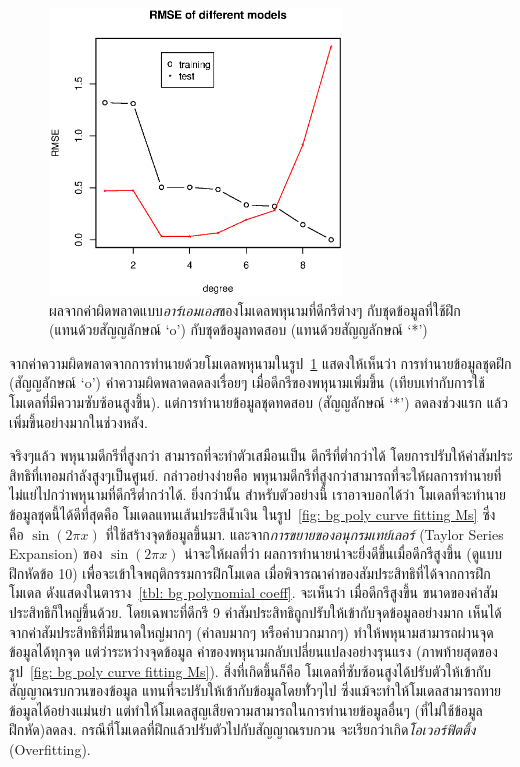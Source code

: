 %
\begin{figure}
\begin{center}
\includegraphics[height=3.0in]{02Background/bgModelEval.eps}
\end{center}
\caption{ผลจากค่าผิดพลาดแบบ\textit{อาร์เอมเอส}ของโมเดลพหุนามที่ดีกรีต่างๆ
กับชุดข้อมูลที่ใช้ฝึก (แทนด้วยสัญญลักษณ์ `o')
กับชุดข้อมูลทดสอบ (แทนด้วยสัญญลักษณ์ `*')}
\label{fig: bg train and test RMSEs}
\end{figure}
%

จากค่าความผิดพลาดจากการทำนายด้วยโมเดลพหุนามในรูป~\ref{fig: bg train and test RMSEs} แสดงให้เห็นว่า การทำนายข้อมูลชุดฝึก (สัญญลักษณ์ `o') ค่าความผิดพลาดลดลงเรื่อยๆ เมื่อดีกรีของพหุนามเพิ่มขึ้น (เทียบเท่ากับการใช้โมเดลที่มีความซับซ้อนสูงขึ้น).
แต่การทำนายข้อมูลชุดทดสอบ (สัญญลักษณ์ `*') ลดลงช่วงแรก แล้วเพิ่มขึ้นอย่างมากในช่วงหลัง.

จริงๆแล้ว พหุนามดีกรีที่สูงกว่า สามารถที่จะทำตัวเสมือนเป็น ดีกรีที่ต่ำกว่าได้ โดยการปรับให้ค่าสัมประสิทธิที่เทอมกำลังสูงๆเป็นศูนย์.
กล่าวอย่างง่ายคือ พหุนามดีกรีที่สูงกว่าสามารถที่จะให้ผลการทำนายที่ไม่แย่ไปกว่าพหุนามที่ดีกรีต่ำกว่าได้.
ยิ่งกว่านั้น สำหรับตัวอย่างนี้ เราอาจบอกได้ว่า โมเดลที่จะทำนายข้อมูลชุดนี้ได้ดีที่สุดคือ โมเดลแทนเส้นประสีน้ำเงิน ในรูป~\ref{fig: bg poly curve fitting Ms} ซึ่ง คือ $\sin(2 \pi x)$  ที่ใช้สร้างจุดข้อมูลขึ้นมา.
และจาก\textit{การขยายของอนุกรมเทย์เลอร์} (Taylor Series Expansion) ของ $\sin(2 \pi x)$ น่าจะให้ผลที่ว่า ผลการทำนายน่าจะยิ่งดีขึ้นเมื่อดีกรีสูงขึ้น (ดูแบบฝึกหัดข้อ 10)
%
เพื่อจะเข้าใจพฤติกรรมการฝึกโมเดล เมื่อพิจารณาค่าของสัมประสิทธิที่ได้จากการฝึกโมเดล ดังแสดงในตาราง~\ref{tbl: bg polynomial coeff}.
จะเห็นว่า เมื่อดีกรีสูงขึ้น ขนาดของค่าสัมประสิทธิก็ใหญ่ขึ้นด้วย.
โดยเฉพาะที่ดีกรี 9 ค่าสัมประสิทธิถูกปรับให้เข้ากับจุดข้อมูลอย่างมาก เห็นได้จากค่าสัมประสิทธิที่มีขนาดใหญ่มากๆ (ค่าลบมากๆ หรือค่าบวกมากๆ) 
ทำให้พหุนามสามารถผ่านจุดข้อมูลได้ทุกจุด
แต่ว่าระหว่างจุดข้อมูล ค่าของพหุนามกลับเปลี่ยนแปลงอย่างรุนแรง (ภาพท้ายสุดของรูป~\ref{fig: bg poly curve fitting Ms}).
สิ่งที่เกิดขึ้นก็คือ โมเดลที่ซับซ้อนสูงได้ปรับตัวให้เข้ากับสัญญาณรบกวนของข้อมูล แทนที่จะปรับให้เข้ากับข้อมูลโดยทั่่วๆไป
ซึ่งแม้จะทำให้โมเดลสามารถทายข้อมูลได้อย่างแม่นยำ แต่ทำให้โมเดลสูญเสียความสามารถในการทำนายข้อมูลอื่นๆ (ที่ไม่ใช้ข้อมูลฝึกหัด)ลดลง.
กรณีที่โมเดลที่ฝึกแล้วปรับตัวไปกับสัญญาณรบกวน จะเรียกว่าเกิด\textit{โอเวอร์ฟิตติ้ง} (Overfitting).  

